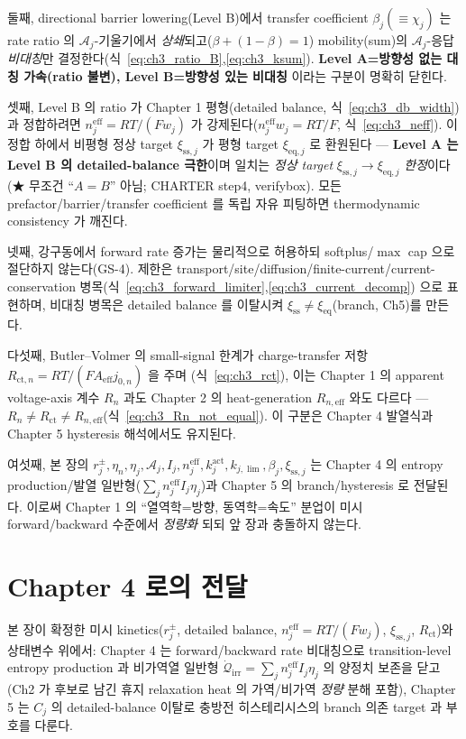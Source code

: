 \documentclass[11pt,a4paper]{article}
\newcommand{\eff}{\mathrm{eff}}
\newcommand{\eq}{\mathrm{eq}}
\newcommand{\irr}{\mathrm{irr}}
\newcommand{\ct}{\mathrm{ct}}
\newcommand{\sstat}{\mathrm{ss}}
\begin{document}
둘째, directional barrier lowering(Level B)에서 transfer coefficient $\beta_j(\equiv\chi_j)$ 는 rate ratio 의
$\mathcal A_j$-기울기에서 \emph{상쇄}되고($\beta+(1-\beta)=1$) mobility(sum)의 $\mathcal A_j$-응답 \emph{비대칭}만
결정한다(식~\eqref{eq:ch3_ratio_B},\allowbreak\eqref{eq:ch3_ksum}). \textbf{Level A=방향성 없는 대칭 가속(ratio 불변),
Level B=방향성 있는 비대칭} 이라는 구분이 명확히 닫힌다.

셋째, Level B 의 ratio 가 Chapter 1 평형(detailed balance, 식~\eqref{eq:ch3_db_width})과 정합하려면
$n_j^{\eff}=RT/(Fw_j)$ 가 강제된다($n_j^{\eff}w_j=RT/F$, 식~\eqref{eq:ch3_neff}). 이 정합 하에서 비평형 정상 target
$\xi_{\sstat,j}$ 가 평형 target $\xi_{\eq,j}$ 로 환원된다 — \textbf{Level A 는 Level B 의 detailed-balance 극한}이며
일치는 \emph{정상 target} $\xi_{\sstat,j}\to\xi_{\eq,j}$ \emph{한정}이다(★ 무조건 ``$A=B$'' 아님; CHARTER step4,
verifybox). 모든 prefactor/barrier/transfer coefficient 를 독립 자유 피팅하면 thermodynamic consistency 가 깨진다.

넷째, 강구동에서 forward rate 증가는 물리적으로 허용하되 softplus/$\max$ cap 으로 절단하지 않는다(GS-4). 제한은
transport/site/diffusion/finite-current/current-conservation 병목(식~\eqref{eq:ch3_forward_limiter},\allowbreak\eqref{eq:ch3_current_decomp})
으로 표현하며, 비대칭 병목은 detailed balance 를 이탈시켜 $\xi_{\sstat}\ne\xi_{\eq}$(branch, Ch5)를 만든다.

다섯째, Butler--Volmer 의 small-signal 한계가 charge-transfer 저항 $R_{\ct,n}=RT/(FA_\eff j_{0,n})$ 을 주며
(식~\eqref{eq:ch3_rct}), 이는 Chapter 1 의 apparent voltage-axis 계수 $R_n$ 과도 Chapter 2 의 heat-generation
$R_{n,\eff}$ 와도 다르다 — \textbf{$R_n\ne R_\ct\ne R_{n,\eff}$}(식~\eqref{eq:ch3_Rn_not_equal}). 이 구분은
Chapter 4 발열식과 Chapter 5 hysteresis 해석에서도 유지된다.

여섯째, 본 장의 $r_j^\pm,\eta_n,\eta_j,\mathcal A_j,I_j,n_j^{\eff},k_j^{\mathrm{act}},k_{j,\lim},\beta_j,\xi_{\sstat,j}$ 는
Chapter 4 의 entropy production/발열 일반형($\sum_j n_j^{\eff}I_j\eta_j$)과 Chapter 5 의 branch/hysteresis 로
전달된다. 이로써 Chapter 1 의 ``열역학=방향, 동역학=속도'' 분업이 미시 forward/backward 수준에서 \emph{정량화}
되되 앞 장과 충돌하지 않는다.

\section*{Chapter 4 로의 전달}
본 장이 확정한 미시 kinetics($r_j^\pm$, detailed balance, $n_j^{\eff}=RT/(Fw_j)$, $\xi_{\sstat,j}$, $R_\ct$)와
상태변수 위에서: Chapter 4 는 forward/backward rate 비대칭으로 transition-level entropy production 과 비가역열
일반형 $\dot{\mathcal Q}_\irr=\sum_j n_j^{\eff}I_j\eta_j$ 의 양정치 보존을 닫고(Ch2 가 후보로 남긴 휴지
relaxation heat 의 가역/비가역 \emph{정량} 분해 포함), Chapter 5 는 $C_j$ 의 detailed-balance 이탈로 충방전
히스테리시스의 branch 의존 target 과 부호를 다룬다.
\end{document}
